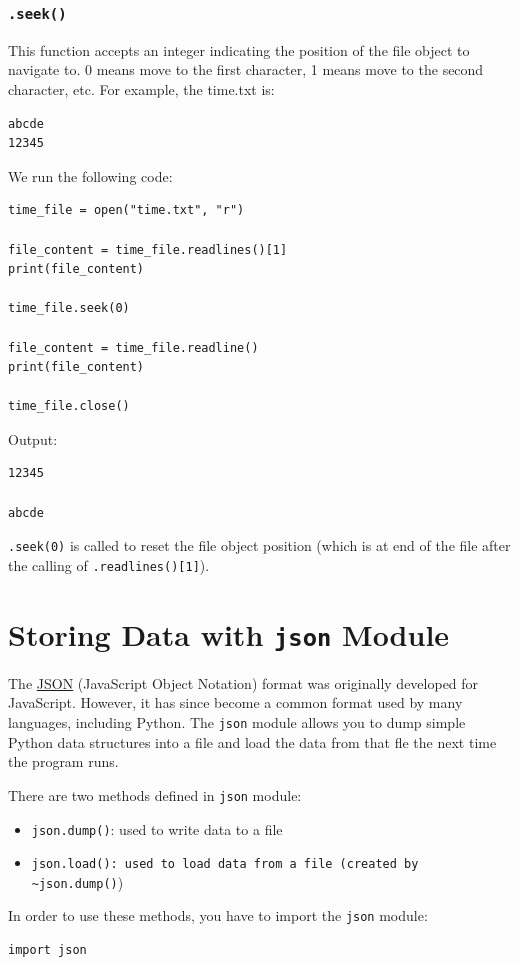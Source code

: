 \documentclass[12pt]{book}
\begin{document}
\subsubsection{\texttt{.seek()}}
\label{sec:org1328c28}
This function accepts an integer indicating the position of the file object to navigate to. 0 means move to the first character, 1 means move to the second character, etc. For example, the time.txt is:
\begin{verbatim}
abcde
12345
\end{verbatim}
We run the following code:
\begin{verbatim}
time_file = open("time.txt", "r")

file_content = time_file.readlines()[1]
print(file_content)

time_file.seek(0)

file_content = time_file.readline()
print(file_content)

time_file.close()
\end{verbatim}
Output:
\begin{verbatim}
12345

abcde

\end{verbatim}
\texttt{.seek(0)} is called to reset the file object position (which is at end of the file after the calling of \texttt{.readlines()[1]}).
\section{Storing Data with \texttt{json} Module}
\label{sec:orgca8cf01}
The \href{http://json.org/}{JSON} (JavaScript Object Notation) format was originally developed for JavaScript. However, it has since become a common format used by many languages, including Python. The \texttt{json} module allows you to dump simple Python data structures into a file and load the data from that fle the next time the program runs.

There are two methods defined in \texttt{json} module:
\begin{itemize}
\item \texttt{json.dump()}: used to write data to a file
\item \texttt{json.load(): used to load data from a file (created by \textasciitilde{}json.dump()})
\end{itemize}
In order to use these methods, you have to import the \texttt{json} module:
\begin{verbatim}
import json
\end{verbatim}
\end{document}
